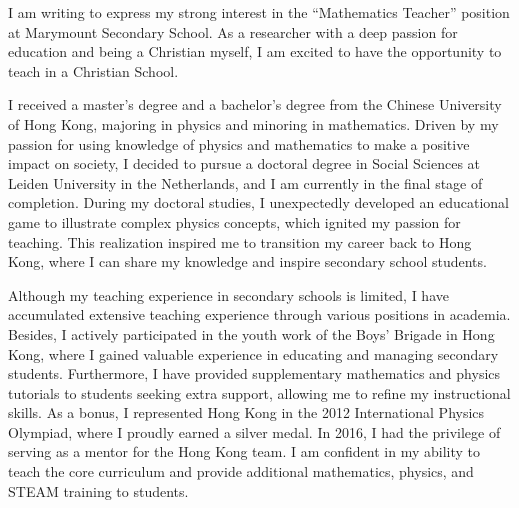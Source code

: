 \documentclass[11pt, a4paper]{awesome-cv}
\begin{document}
\makecvheader[R]

\makecvfooter
  {}%
  {}%
  {}

\makelettertitle

\begin{cvletter}

I am writing to express my strong interest in the ``Mathematics Teacher'' position at Marymount Secondary School. As a researcher with a deep passion for education and being a Christian myself, I am excited to have the opportunity to teach in a Christian School.

I received a master's degree and a bachelor's degree from the Chinese University of Hong Kong, majoring in physics and minoring in mathematics. Driven by my passion for using knowledge of physics and mathematics to make a positive impact on society, I decided to pursue a doctoral degree in Social Sciences at Leiden University in the Netherlands, and I am currently in the final stage of completion. During my doctoral studies, I unexpectedly developed an educational game to illustrate complex physics concepts, which ignited my passion for teaching. This realization inspired me to transition my career back to Hong Kong, where I can share my knowledge and inspire secondary school students.

Although my teaching experience in secondary schools is limited, I have accumulated extensive teaching experience through various positions in academia. Besides, I actively participated in the youth work of the Boys' Brigade in Hong Kong, where I gained valuable experience in educating and managing secondary students. Furthermore, I have provided supplementary mathematics and physics tutorials to students seeking extra support, allowing me to refine my instructional skills. As a bonus, I represented Hong Kong in the 2012 International Physics Olympiad, where I proudly earned a silver medal. In 2016, I had the privilege of serving as a mentor for the Hong Kong team. I am confident in my ability to teach the core curriculum and provide additional mathematics, physics, and STEAM training to students.


\end{cvletter}
\end{document}
